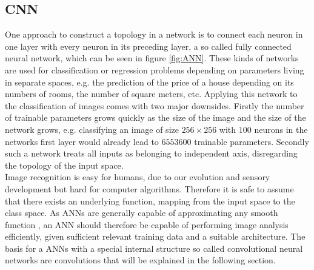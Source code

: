 \subsection{CNN}\label{sec:DiscreteConvolutions}

One approach to construct a topology in a network is to connect each neuron in one layer with every neuron in its preceding layer, a so called fully connected neural network, which can be seen in figure \ref{fig:ANN}. These kinds of networks are used for classification or regression problems depending on parameters living in separate spaces, e.g. the prediction of the price of a house depending on its numbers of rooms, the number of square meters, etc. Applying this network to the classification of images comes with two major downsides. Firstly the number of trainable parameters grows quickly as the size of the image and the size of the network grows, e.g. classifying an image of size $256\times 256$ with $100$ neurons in the networks first layer would already lead to $6553600$ trainable parameters. Secondly such a network treats all inputs as belonging to independent axis, disregarding the topology of the input space. \\

Image recognition is easy for humans, due to our evolution and sensory development but hard for computer algorithms. Therefore it is safe to assume that there exists an underlying function, mapping from the input space to the class space. As ANNs are generally capable of approximating any smooth function \cite{Hornik1989}, an ANN should therefore be capable of performing image analysis efficiently, given sufficient relevant training data and a suitable architecture. The basis for a ANNs with a special internal structure so called convolutional neural networks are convolutions that will be explained in the following section. \\




